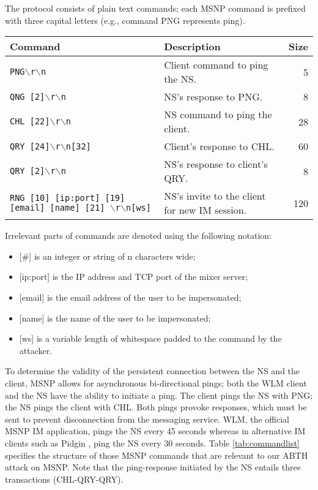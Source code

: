 \documentclass{sig-alternate}
\begin{document}
The protocol consists of plain text commands; each MSNP command is prefixed with three capital letters (e.g., command PNG represents ping).

\begin{table*}[tbp]
	\centering

	\caption {MSNP Commands}
	\label{tab:commandlist}

	\begin{tabular}{llr}
		\hline
		\hline
		\textbf{Command} & \textbf{Description} & \textbf{Size} \\
		\hline
		\texttt{PNG$\backslash$r$\backslash$n} & Client command to ping the NS. & 5 \\
		\texttt{QNG [2]$\backslash$r$\backslash$n} & NS's response to PNG. & 8 \\
		\texttt{CHL [22]$\backslash$r$\backslash$n} & NS command to ping the client. & 28 \\
		\texttt{QRY [24]$\backslash$r$\backslash$n[32]} & Client's response to CHL. & 60 \\
		\texttt{QRY [2]$\backslash$r$\backslash$n} & NS's response to client's QRY. & 8 \\
		\texttt{RNG [10] [ip:port] [19] [email] [name] [21] $\backslash$r$\backslash$n[ws]} & NS's invite to the client for new IM session. & 120 \\
		\hline
	\end{tabular}

	\begin{flushleft}
	Irrelevant parts of commands are denoted using the following notation:
	\begin{itemize}
		\item {[\#]} is an integer or string of n characters wide;
		\item {[ip:port]} is the IP address and TCP port of the mixer server;
		\item {[email]} is the email address of the user to be impersonated;
		\item {[name]} is the name of the user to be impersonated;
		\item {[ws]} is a variable length of whitespace padded to the command by the attacker.
	\end{itemize}
	\end{flushleft}

\end{table*}

To determine the validity of the persistent connection between the NS and the client, MSNP allows for asynchronous bi-directional pings; both the WLM client and the NS have the ability to initiate a ping.
The client pings the NS with PNG; the NS pings the client with CHL.
Both pings provoke responses, which must be sent to prevent disconnection from the messaging service.
WLM, the official MSNP IM application, pings the NS every 45 seconds whereas in alternative IM clients such as Pidgin \cite{pidgin:url}, ping the NS every 30 seconds.
Table \ref{tab:commandlist} specifies the structure of those MSNP commands that are relevant to our ABTH attack on MSNP.
Note that the ping-response initiated by the NS entails three transactions (CHL-QRY-QRY).
\end{document}
